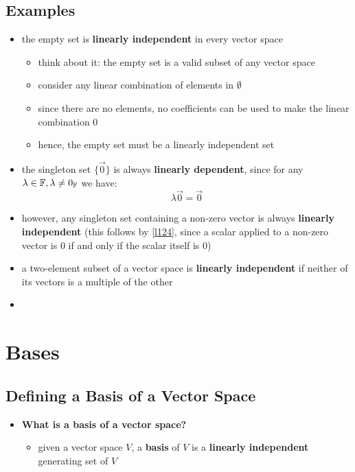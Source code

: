 \documentclass{exam}
\begin{document}
\subsection{Examples}

\begin{itemize}
    \item the empty set is \textbf{linearly independent} in every vector space
    \begin{itemize}
        \item think about it: the empty set is a valid subset of any vector space
        \item consider any linear combination of elements in $\emptyset$
        \item since there are no elements, no coefficients can be used to make the linear combination 0
        \item hence, the empty set must be a linearly independent set
    \end{itemize}
    \item the singleton set $\{\vec{0}\}$ is always \textbf{linearly dependent}, since for any $\lambda \in \mathbb{F}, \lambda \neq 0_{\mathbb{F}}$ we have:
    \[
    \lambda \vec{0} = \vec{0}
    \]
    \item however, any singleton set containing a non-zero vector is always \textbf{linearly independent} (this follows by \eqref{l124}, since a scalar applied to a non-zero vector is 0 if and only if the scalar itself is 0)
    \item a two-element subset of a vector space is \textbf{linearly independent} if neither of its vectors is a multiple of the other
    \item 
\end{itemize}

\section{Bases}

\subsection{Defining a Basis of a Vector Space}

\begin{itemize}
    \item \textbf{What is a basis of a vector space?}
    \begin{itemize}
        \item given a vector space $V$, a \textbf{basis} of $V$ is a \textbf{linearly independent} generating set of $V$
    \end{itemize}
\end{itemize}
\end{document}
